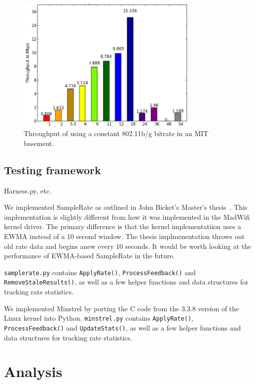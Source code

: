 \documentclass[letterpaper,twocolumn,10pt]{article}
\begin{document}
\begin{figure}[htb]
  \hspace{-.75em}\includegraphics[width=3.5in]{constant.png}\vspace{-0em}
  \caption{Throughput of using a constant 802.11b/g bitrate in an MIT basement.}
\end{figure}

\subsection{Testing framework}

Harness.py, etc.

We implemented SampleRate as outlined in John Bicket's Master's thesis~\cite{samplerate}. This implementation is slightly different from how it was implemented in the MadWifi kernel driver. The primary difference is that the kernel implementatiion uses a EWMA instead of a 10 second window. The thesis implmenentation throws out old rate data and begins anew every 10 seconds. It would be worth looking at the performance of EWMA-based SampleRate in the future. 

\texttt{samplerate.py} contains \texttt{ApplyRate()}, \texttt{ProcessFeedback()} and  \texttt{RemoveStaleResults()}, as well as a few helper functions and data structures for tracking rate statistics. 

We implemented Minstrel by porting the C code from the 3.3.8 version of the Linux kernel into Python. \texttt{minstrel.py} contains \texttt{ApplyRate()}, \texttt{ProcessFeedback()} and  \texttt{UpdateStats()}, as well as a few helper functions and data structures for tracking rate statistics. 


\section{Analysis}
\end{document}
